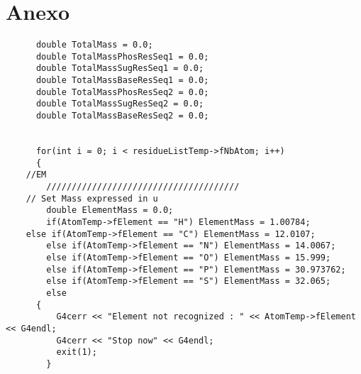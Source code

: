 %
%
\clearpage
\section{Anexo}
\label{app:M}
\lstset {language=C++}
\begin{lstlisting}
      double TotalMass = 0.0;
      double TotalMassPhosResSeq1 = 0.0;
      double TotalMassSugResSeq1 = 0.0;
      double TotalMassBaseResSeq1 = 0.0;
      double TotalMassPhosResSeq2 = 0.0;
      double TotalMassSugResSeq2 = 0.0;
      double TotalMassBaseResSeq2 = 0.0;


      for(int i = 0; i < residueListTemp->fNbAtom; i++)
      {
	//EM
      	//////////////////////////////////////
	// Set Mass expressed in u
        double ElementMass = 0.0;
        if(AtomTemp->fElement == "H") ElementMass = 1.00784;
	else if(AtomTemp->fElement == "C") ElementMass = 12.0107;
        else if(AtomTemp->fElement == "N") ElementMass = 14.0067;
        else if(AtomTemp->fElement == "O") ElementMass = 15.999;
        else if(AtomTemp->fElement == "P") ElementMass = 30.973762;
        else if(AtomTemp->fElement == "S") ElementMass = 32.065;
        else
	  {
          G4cerr << "Element not recognized : " << AtomTemp->fElement << G4endl;
          G4cerr << "Stop now" << G4endl;
          exit(1);
        }
\end{lstlisting}


